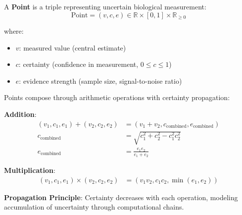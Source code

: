 \begin{definition}
A \textbf{Point} is a triple representing uncertain biological measurement:
\begin{equation}
\text{Point} = (v, c, e) \in \mathbb{R} \times [0,1] \times \mathbb{R}_{\geq 0}
\end{equation}

where:
\begin{itemize}
\item $v$: measured value (central estimate)
\item $c$: certainty (confidence in measurement, $0 \leq c \leq 1$)
\item $e$: evidence strength (sample size, signal-to-noise ratio)
\end{itemize}
\end{definition}

\begin{proposition}
Points compose through arithmetic operations with certainty propagation:

\textbf{Addition}:
\begin{align}
(v_1, c_1, e_1) + (v_2, c_2, e_2) &= (v_1 + v_2, c_{\text{combined}}, e_{\text{combined}}) \\
c_{\text{combined}} &= \sqrt{c_1^2 + c_2^2 - c_1^2 c_2^2} \\
e_{\text{combined}} &= \frac{e_1 e_2}{e_1 + e_2}
\end{align}

\textbf{Multiplication}:
\begin{align}
(v_1, c_1, e_1) \times (v_2, c_2, e_2) &= (v_1 v_2, c_1 c_2, \min(e_1, e_2))
\end{align}

\textbf{Propagation Principle}: Certainty decreases with each operation, modeling accumulation of uncertainty through computational chains.
\end{proposition}

